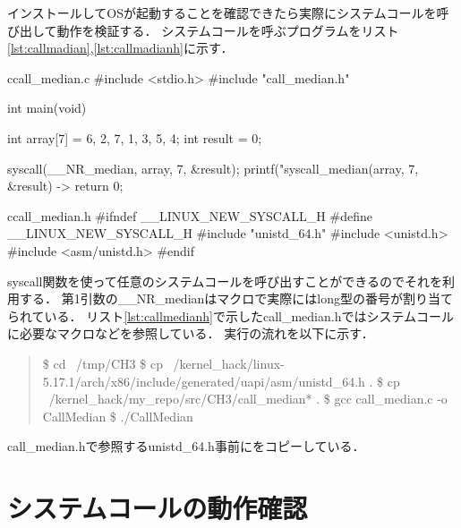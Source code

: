 インストールしてOSが起動することを確認できたら実際にシステムコールを呼び出して動作を検証する．
システムコールを呼ぶプログラムをリスト\ref{lst:callmadian},\ref{lst:callmadianh}に示す．
\begin{longlisting}
\begin{myminted}{c}{call_median.c}
#include <stdio.h>
#include "call_median.h"

int main(void) {
    int array[7] = {6, 2, 7, 1, 3, 5, 4};
    int result = 0;

    syscall(__NR_median, array, 7, &result);
    printf("syscall_median(array, 7, &result) -> %
    return 0;
}
\end{myminted}
\caption{medianを呼ぶプログラム}
\label{lst:callmedian}
\end{longlisting}

\begin{longlisting}
\begin{myminted}{c}{call_median.h}
#ifndef __LINUX_NEW_SYSCALL_H
#define __LINUX_NEW_SYSCALL_H
#include "unistd_64.h"
#include <unistd.h>
#include <asm/unistd.h>
#endif
\end{myminted}
\caption{call_median.h}
\label{lst:callmedianh}
\end{longlisting}

syscall関数を使って任意のシステムコールを呼び出すことができるのでそれを利用する．
第1引数の__NR_medianはマクロで実際にはlong型の番号が割り当てられている．\cite{unistd32}
リスト\ref{lst:callmedianh}で示したcall_median.hではシステムコールに必要なマクロなどを参照している．
実行の流れを以下に示す．

\begin{quote}
\$ cd ~/tmp/CH3
\$ cp ~/kernel_hack/linux-5.17.1/arch/x86/include/generated/uapi/asm/unistd_64.h .
\$ cp ~/kernel_hack/my_repo/src/CH3/call_median* .
\$ gcc call_median.c -o CallMedian
\$ ./CallMedian
\end{quote}

call_median.hで参照するunistd_64.h事前にをコピーしている．

\section{システムコールの動作確認}



